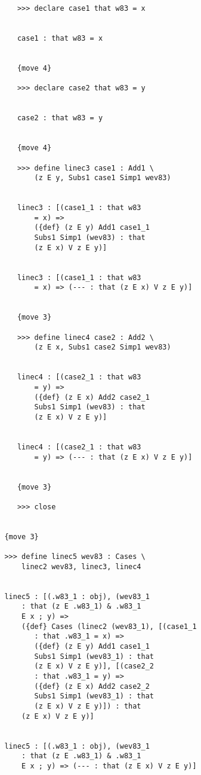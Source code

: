 \documentclass[12pt]{article}
\begin{document}
\begin{verbatim}
            >>> declare case1 that w83 = x


            case1 : that w83 = x


            {move 4}

            >>> declare case2 that w83 = y


            case2 : that w83 = y


            {move 4}

            >>> define linec3 case1 : Add1 \
                (z E y, Subs1 case1 Simp1 wev83)


            linec3 : [(case1_1 : that w83 
                = x) => 
                ({def} (z E y) Add1 case1_1 
                Subs1 Simp1 (wev83) : that 
                (z E x) V z E y)]


            linec3 : [(case1_1 : that w83 
                = x) => (--- : that (z E x) V z E y)]


            {move 3}

            >>> define linec4 case2 : Add2 \
                (z E x, Subs1 case2 Simp1 wev83)


            linec4 : [(case2_1 : that w83 
                = y) => 
                ({def} (z E x) Add2 case2_1 
                Subs1 Simp1 (wev83) : that 
                (z E x) V z E y)]


            linec4 : [(case2_1 : that w83 
                = y) => (--- : that (z E x) V z E y)]


            {move 3}

            >>> close


         {move 3}

         >>> define linec5 wev83 : Cases \
             linec2 wev83, linec3, linec4


         linec5 : [(.w83_1 : obj), (wev83_1 
             : that (z E .w83_1) & .w83_1 
             E x ; y) => 
             ({def} Cases (linec2 (wev83_1), [(case1_1 
                : that .w83_1 = x) => 
                ({def} (z E y) Add1 case1_1 
                Subs1 Simp1 (wev83_1) : that 
                (z E x) V z E y)], [(case2_2 
                : that .w83_1 = y) => 
                ({def} (z E x) Add2 case2_2 
                Subs1 Simp1 (wev83_1) : that 
                (z E x) V z E y)]) : that 
             (z E x) V z E y)]


         linec5 : [(.w83_1 : obj), (wev83_1 
             : that (z E .w83_1) & .w83_1 
             E x ; y) => (--- : that (z E x) V z E y)]



\end{verbatim}
\end{document}
